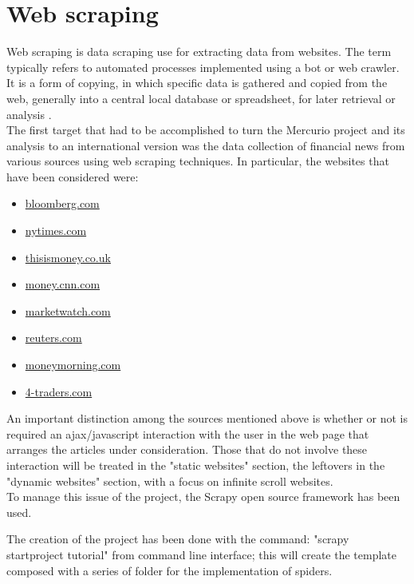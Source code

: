 \section{Web scraping}
Web scraping is data scraping use for extracting data from websites. The term typically refers to automated processes implemented using a bot or web crawler. It is a form of copying, in which specific data is gathered and copied from the web, generally into a central local database or spreadsheet, for later retrieval or analysis \cite{webscrapingwiki}. \\
The first target that had to be accomplished to turn the Mercurio project and its analysis to an international version was the data collection of financial news from various sources using web scraping techniques. In particular, the websites that have been considered were: 
\begin{itemize}
\item \href{https://www.bloomberg.com}{bloomberg.com}
\item \href{https://www.nytimes.com}{nytimes.com}
\item \href{https://www.thisismoney.co.uk}{thisismoney.co.uk}
\item \href{http://money.cnn.com}{money.cnn.com}
\item \href{http://www.marketwatch.com}{marketwatch.com}
\item \href{http://www.reuters.com}{reuters.com}
\item \href{http://www.moneymorning.com}{moneymorning.com} 
\item \href{http://www.4-traders.com/}{4-traders.com}
\end{itemize}
An important distinction among the sources mentioned above is whether or not is required an ajax/javascript interaction with the user in the web page that arranges the articles under consideration. Those that do not involve these interaction will be treated in the "static websites" section, the leftovers in the "dynamic websites" section, with a focus on infinite scroll websites. \\ 
To manage this issue of the project, the Scrapy open source framework \cite{scrapyframework} has been used. 
\par
The creation of the project has been done with the command: "scrapy startproject tutorial" from command line interface; this will create the template composed with a series of folder for the implementation of spiders.
